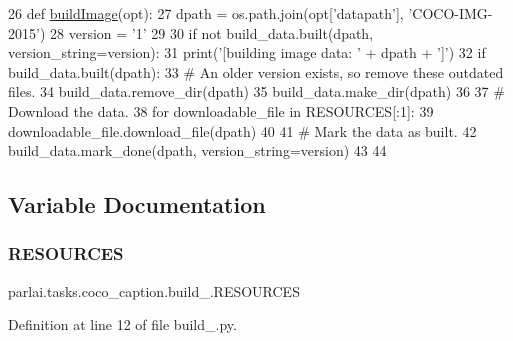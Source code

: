 \begin{DoxyCode}
26 \textcolor{keyword}{def }\hyperlink{namespaceparlai_1_1tasks_1_1coco__caption_1_1build__2015_a52edd896124184ec02d76b23368557aa}{buildImage}(opt):
27     dpath = os.path.join(opt[\textcolor{stringliteral}{'datapath'}], \textcolor{stringliteral}{'COCO-IMG-2015'})
28     version = \textcolor{stringliteral}{'1'}
29 
30     \textcolor{keywordflow}{if} \textcolor{keywordflow}{not} build\_data.built(dpath, version\_string=version):
31         print(\textcolor{stringliteral}{'[building image data: '} + dpath + \textcolor{stringliteral}{']'})
32         \textcolor{keywordflow}{if} build\_data.built(dpath):
33             \textcolor{comment}{# An older version exists, so remove these outdated files.}
34             build\_data.remove\_dir(dpath)
35         build\_data.make\_dir(dpath)
36 
37         \textcolor{comment}{# Download the data.}
38         \textcolor{keywordflow}{for} downloadable\_file \textcolor{keywordflow}{in} RESOURCES[:1]:
39             downloadable\_file.download\_file(dpath)
40 
41         \textcolor{comment}{# Mark the data as built.}
42         build\_data.mark\_done(dpath, version\_string=version)
43 
44 
\end{DoxyCode}


\subsection{Variable Documentation}
\mbox{\label{namespaceparlai_1_1tasks_1_1coco__caption_1_1build__2015_ae3c3dad2f51625b9c8c12f2d46ce4f3c}} 
\subsubsection{\texorpdfstring{R\+E\+S\+O\+U\+R\+C\+ES}{RESOURCES}}
{\footnotesize\ttfamily parlai.\+tasks.\+coco\+\_\+caption.\+build\+\_.\+R\+E\+S\+O\+U\+R\+C\+ES}



Definition at line 12 of file build\+\_.\+py.

